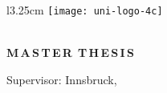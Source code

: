 \frontmatter
\pagestyle{empty}


\begin{titlepage}
\rule{0mm}{1mm}
\vspace*{10mm}
\begin{wrapfigure}{l}{3.25cm}
    \texttt{[image: uni-logo-4c]}
\end{wrapfigure}
\begin{flushright}
    \setlength{\unitlength}{1cm}
    {\large \MOrg \vskip 5mm
    \MInstitution}\\
    \textbf{\large \MGroup}
    \vskip 15mm
    \textbf{\Large M\,A\,S\,T\,E\,R\,\,\,T\,H\,E\,S\,I\,S}
\end{flushright}

\begin{center}
    \vskip 25mm
    {\LARGE\bf \MTitle}
    \vskip 5mm
    \vskip 1cm
    {\large \textbf{\MAuthor}}\vskip 15mm
    \vskip 2cm
    {\large Supervisor: \MSupervisor}
    \vfill
    {\large Innsbruck, \MDate} 
\end{center}
\end{titlepage} 

\ClearShipoutPicture
